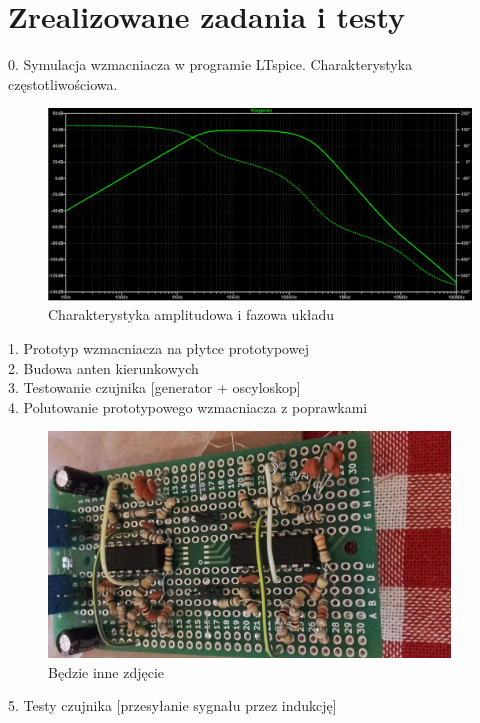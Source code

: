 \documentclass[12pt]{article}
\begin{document}
\section{Zrealizowane zadania i testy}
0. Symulacja wzmacniacza w programie LTspice. Charakterystyka częstotliwościowa.\\
\begin{figure}[H]
\begin{center}
\includegraphics[width=1\textwidth]{figures/ampl_faz.png}
\caption{Charakterystyka amplitudowa i fazowa układu}
\end{center}
\end{figure}
1. Prototyp wzmacniacza na płytce prototypowej\\
2. Budowa anten kierunkowych\\
3. Testowanie czujnika [generator + oscyloskop]\\
4. Polutowanie prototypowego wzmacniacza z poprawkami\\
\begin{figure}[H]
\begin{center}
\includegraphics[width=0.95\textwidth]{figures/plytka.png}
\caption{Będzie inne zdjęcie}
\end{center}
\end{figure}
5. Testy czujnika [przesyłanie sygnału przez indukcję]\\
\end{document}
